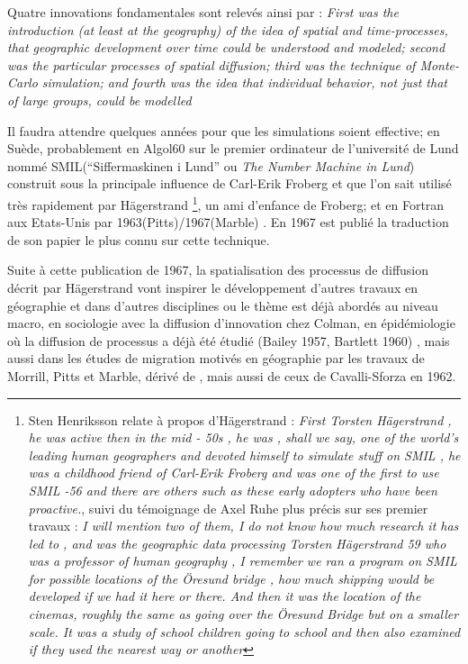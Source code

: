 Quatre innovations fondamentales sont relevés ainsi par \textcite{Morril2005} : \textit{First was the introduction (at least at the geography) of the idea of spatial and time-processes, that geographic development over time could be understood and modeled; second was the particular processes of spatial diffusion; third was the technique of Monte-Carlo simulation; and fourth was the idea that individual behavior, not just that of large groups, could be modelled} 

Il faudra attendre quelques années pour que les simulations soient effective; en Suède, probablement en Algol60 sur le premier ordinateur de l'université de Lund nommé SMIL(\foreignquote{sweden}{Siffermaskinen i Lund} ou \textit{The Number Machine in Lund}) construit sous la principale influence de Carl-Erik Froberg et que l'on sait utilisé très rapidement par Hägerstrand \footnote{\autocite[32-33]{Lindgren2008} Sten Henriksson relate à propos d'Hägerstrand : \textit{First Torsten Hägerstrand , he was active then in the mid - 50s , he was , shall we say, one of the world's leading human geographers and devoted himself to simulate stuff on SMIL , he was a childhood friend of Carl-Erik Froberg and was one of the first to use SMIL -56 and there are others such as these early adopters who have been proactive.}, suivi du témoignage de Axel Ruhe plus précis sur ses premier travaux : \textit{I will mention two of them, I do not know how much research it has led to , and was the geographic data processing Torsten Hägerstrand 59 who was a professor of human geography , I remember we ran a program on SMIL for possible locations of the Öresund bridge , how much shipping would be developed if we had it here or there. And then it was the location of the cinemas, roughly the same as going over the Öresund Bridge but on a smaller scale. It was a study of school children going to school and then also examined if they used the nearest way or another}}, un ami d'enfance de Froberg; et en Fortran aux Etats-Unis par 1963(Pitts)/1967(Marble) \autocite{Morril2005, Marble1972, Pitts1963}. En 1967 \autocite{Hagerstrand1967a} est publié la traduction de son papier le plus connu sur cette technique. 

Suite à cette publication de 1967, la spatialisation des processus de diffusion décrit par Hägerstrand vont inspirer le développement d'autres travaux en géographie et dans d'autres disciplines ou le thème est déjà abordés au niveau macro, en sociologie avec la diffusion d'innovation chez Colman, en épidémiologie \autocite{Cliff1981, Cliff2000} où la diffusion de processus a déjà été étudié (Bailey 1957, Bartlett 1960) \textcite{Pitts1963, Morrill1968}, mais aussi dans les études de migration motivés en géographie par les travaux de Morrill, Pitts et Marble, dérivé de \autocite{Wolpert1965}, mais aussi de ceux de Cavalli-Sforza en 1962. 

